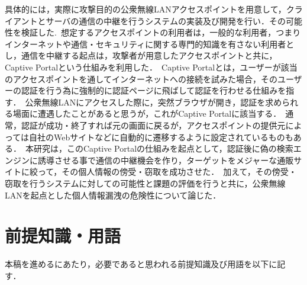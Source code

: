 \documentclass[dvipdfmx]{jsarticle}
\begin{document}
        具体的には，実際に攻撃目的の公衆無線LANアクセスポイントを用意して，クライアントとサーバの通信の中継を行うシステムの実装及び開発を行い．その可能性を検証した.\
        想定するアクセスポイントの利用者は，一般的な利用者，つまりインターネットや通信・セキュリティに関する専門的知識を有さない利用者とし，通信を中継する起点は，攻撃者が用意したアクセスポイントと共に，Captive Portalという仕組みを利用した．\
        Captive Portalとは，ユーザーが該当のアクセスポイントを通してインターネットへの接続を試みた場合，そのユーザーの認証を行う為に強制的に認証ページに飛ばして認証を行わせる仕組みを指す．\
        公衆無線LANにアクセスした際に，突然ブラウザが開き，認証を求められる場面に遭遇したことがあると思うが，これがCaptive Portalに該当する．\
        通常，認証が成功・終了すれば元の画面に戻るが，アクセスポイントの提供元によっては自社のWebサイトなどに自動的に遷移するように設定されているものもある．\
        本研究は，このCaptive Portalの仕組みを起点として，認証後に偽の検索エンジンに誘導させる事で通信の中継機会を作り，ターゲットをメジャーな通販サイトに絞って，その個人情報の傍受・窃取を成功させた．\
        加えて，その傍受・窃取を行うシステムに対しての可能性と課題の評価を行うと共に，公衆無線LANを起点とした個人情報漏洩の危険性について論じた．\
    \section{前提知識・用語}
        本稿を進めるにあたり，必要であると思われる前提知識及び用語を以下に記す．\
\end{document}
